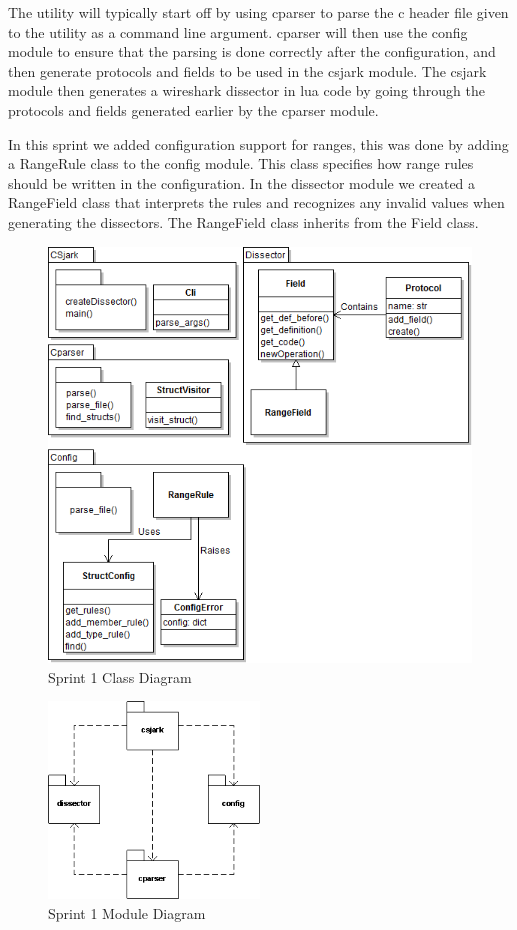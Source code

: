 The \gls{utility} will typically start off by using cparser to parse the \Gls{c} \gls{header} file given to
the \gls{utility} as a command line argument. cparser will then use the config module
to ensure that the parsing is done correctly after the configuration, and then
generate protocols and fields to be used in the csjark module. The csjark
module then generates a \Gls{wireshark} \gls{dissector} in \Gls{lua} code by going through the
protocols and fields generated earlier by the cparser module.

In this sprint we added configuration support for ranges, this was done 
by adding a RangeRule class to the config module. This class specifies how
range rules should be written in the configuration. In the \gls{dissector} module
we created a RangeField class that interprets the rules
and recognizes any invalid values when generating the \glspl{dissector}.
The RangeField class inherits from the Field class.

\begin{figure}[!htb]
	\center
	\includegraphics[width=\textwidth]{./sprints/img/ClassDiagramSprint1v2}
	\caption{Sprint 1 Class Diagram\label{fig:sp1_class}}
\end{figure}

\begin{figure}[!htb]
	\center
	\includegraphics[width=0.50\textwidth]{./sprints/img/sp1modulediagram}
	\caption{Sprint 1 Module Diagram\label{fig:sp1_module}}
\end{figure}

